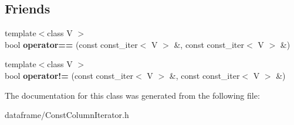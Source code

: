 \subsection*{Friends}
\begin{DoxyCompactItemize}
\item 
\mbox{\label{classDataFrame_1_1ConstColumnIterator_a296e4ef4f1f9cf5dcc7b37059c80176f}} 
{\footnotesize template$<$class V $>$ }\\bool {\bfseries operator==} (const const\+\_\+iter$<$ V $>$ \&, const const\+\_\+iter$<$ V $>$ \&)
\item 
\mbox{\label{classDataFrame_1_1ConstColumnIterator_aeb3fca876f6e8343e6a0fa8ec2532fe2}} 
{\footnotesize template$<$class V $>$ }\\bool {\bfseries operator!=} (const const\+\_\+iter$<$ V $>$ \&, const const\+\_\+iter$<$ V $>$ \&)
\end{DoxyCompactItemize}


The documentation for this class was generated from the following file\+:\begin{DoxyCompactItemize}
\item 
dataframe/Const\+Column\+Iterator.\+h\end{DoxyCompactItemize}
